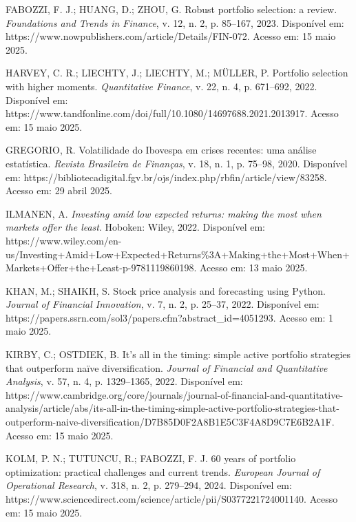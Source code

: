 \begin{thebibliography}{99}
FABOZZI, F. J.; HUANG, D.; ZHOU, G. Robust portfolio selection: a review. \textit{Foundations and Trends in Finance}, v. 12, n. 2, p. 85--167, 2023. Disponível em: https://www.nowpublishers.com/article/Details/FIN-072. Acesso em: 15 maio 2025.

HARVEY, C. R.; LIECHTY, J.; LIECHTY, M.; MÜLLER, P. Portfolio selection with higher moments. \textit{Quantitative Finance}, v. 22, n. 4, p. 671--692, 2022. Disponível em: https://www.tandfonline.com/doi/full/10.1080/14697688.2021.2013917. Acesso em: 15 maio 2025.

GREGORIO, R. Volatilidade do Ibovespa em crises recentes: uma análise estatística. \textit{Revista Brasileira de Finanças}, v. 18, n. 1, p. 75--98, 2020. Disponível em: https://bibliotecadigital.fgv.br/ojs/index.php/rbfin/article/view/83258. Acesso em: 29 abril 2025.

ILMANEN, A. \textit{Investing amid low expected returns: making the most when markets offer the least}. Hoboken: Wiley, 2022. Disponível em: https://www.wiley.com/en-us/Investing+Amid+Low+Expected+Returns\%3A+Making+the+Most+When+Markets+Offer+the+Least-p-9781119860198. Acesso em: 13 maio 2025.

KHAN, M.; SHAIKH, S. Stock price analysis and forecasting using Python. \textit{Journal of Financial Innovation}, v. 7, n. 2, p. 25--37, 2022. Disponível em: https://papers.ssrn.com/sol3/papers.cfm?abstract\_id=4051293. Acesso em: 1 maio 2025.

KIRBY, C.; OSTDIEK, B. It's all in the timing: simple active portfolio strategies that outperform naïve diversification. \textit{Journal of Financial and Quantitative Analysis}, v. 57, n. 4, p. 1329--1365, 2022. Disponível em: https://www.cambridge.org/core/journals/journal-of-financial-and-quantitative-analysis/article/abs/its-all-in-the-timing-simple-active-portfolio-strategies-that-outperform-naive-diversification/D7B85D0F2A8B1E5C3F4A8D9C7E6B2A1F. Acesso em: 15 maio 2025.

KOLM, P. N.; TUTUNCU, R.; FABOZZI, F. J. 60 years of portfolio optimization: practical challenges and current trends. \textit{European Journal of Operational Research}, v. 318, n. 2, p. 279--294, 2024. Disponível em: https://www.sciencedirect.com/science/article/pii/S0377221724001140. Acesso em: 15 maio 2025.


\end{thebibliography}
